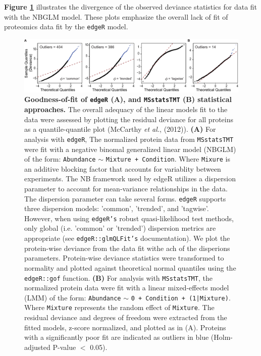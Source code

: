 \documentclass[11pt]{elife}\usepackage[]{graphicx}\usepackage[]{color}
\begin{document}
\textbf{Figure \ref{fig:gof}} 
illustrates the divergence of the observed deviance statistics for data fit with
the NBGLM model. These plots emphasize the overall lack of fit of proteomics data 
fit by the \texttt{edgeR} model. 

\begin{figure}[ht]
	\begin{fullwidth}
		\begin{center}
		\includegraphics[width=0.9\paperwidth,keepaspectratio]{gof}
		\caption{\textbf{Goodness-of-fit of \texttt{edgeR} (A), and 
		\texttt{MSstatsTMT} (B) statistical approaches.} The overall
		adequacy of the linear models fit to the data were assessed 
		by plotting the residual deviance for all proteins as a 
		quantile-quantile plot (McCarthy \textit{et al.}, (2012)). 
		\textbf{(A)} For analysis with \texttt{edgeR}, The normalized
		protein data from \texttt{MSstatsTMT} were fit with a negative
		binomal generalized linear model (NBGLM) of the form: 
		\texttt{Abundance} $\sim$ \texttt{Mixture + Condition}.
		Where \texttt{Mixure} is an additive blocking factor that 
		accounts for variablity between experiments. 
		The NB framework used by edgeR utilizes a dispersion parameter 
		to account for mean-variance relationships in the data.
		The dispersion parameter can take several forms. 
                \texttt{edgeR} supports three dispersion models: 'common',
		'trended', and 'tagwise'. However, when using \texttt{edgeR's}
		robust quasi-likelihood test methods, only global (i.e. 'common'
		or 'trended') dispersion metrics are appropriate 
		(see \texttt{edgeR::glmQLFit's} documentation). 
		We plot the protein-wise deviance from the data fit withe ach of
		the disperions parameters. Protein-wise deviance
		statistics were transformed to normality and plotted against
		theoretical normal quantiles using the \texttt{edgeR::gof}
		function. \textbf{(B)} For analysis with \texttt{MSstatsTMT},
		the normalized protein data were fit with a linear mixed-effects 
		model (LMM) of the form: 
		\texttt{Abundance} $\sim$ \texttt{0 + Condition + (1|Mixture)}. 
		Where \texttt{Mixture} represents the random effect
		of \texttt{Mixture}. The residual deviance and degrees of 
		freedom were extracted from the fitted models, z-score
		normalized, and plotted as in (A). Proteins with a significantly 
		poor fit are indicated as outliers in blue 
		(Holm-adjusted P-value $<$ 0.05).}
		\label{fig:gof}
	\end{center}
	\end{fullwidth}
\end{figure}
\end{document}
